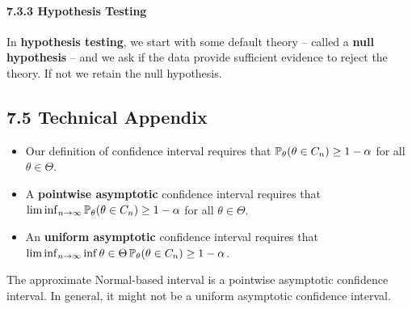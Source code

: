\paragraph{7.3.3 Hypothesis Testing}\label{hypothesis-testing}
In \textbf{hypothesis testing}, we start with some default theory --
called a \textbf{null hypothesis} -- and we ask if the data provide
sufficient evidence to reject the theory. If not we retain the null
hypothesis.

\subsection*{7.5 Technical Appendix}
\begin{itemize}[tightlist]
\item
  Our definition of confidence interval requires that
  \(\operatorname{\mathbb{P}}_\theta(\theta \in C_{n}) \geq 1 - \alpha\) for all
  \(\theta \in \Theta\).
\item
  A \textbf{pointwise asymptotic} confidence interval requires that
  \(\lim \inf_{n \rightarrow \infty} \operatorname{\mathbb{P}}_\theta(\theta \in C_{n}) \geq 1 - \alpha\)
  for all \(\theta \in \Theta\).
\item
  An \textbf{uniform asymptotic} confidence interval requires that
  \(\lim \inf_{n \rightarrow \infty} \inf{\theta \in \Theta} \operatorname{\mathbb{P}}_\theta(\theta \in C_{n}) \geq 1 - \alpha\).
\end{itemize}
The approximate Normal-based interval is a pointwise asymptotic
confidence interval. In general, it might not be a uniform asymptotic
confidence interval.
